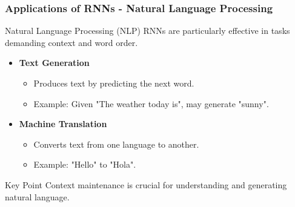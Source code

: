 \documentclass[aspectratio=169]{beamer}
\begin{document}
\begin{frame}[fragile]
    \frametitle{Applications of RNNs - Natural Language Processing}
    \begin{block}{Natural Language Processing (NLP)}
        RNNs are particularly effective in tasks demanding context and word order.
    \end{block}
    
    \begin{itemize}
        \item \textbf{Text Generation}
            \begin{itemize}
                \item Produces text by predicting the next word.
                \item Example: Given "The weather today is", may generate "sunny".
            \end{itemize}
        
        \item \textbf{Machine Translation}
            \begin{itemize}
                \item Converts text from one language to another.
                \item Example: "Hello" to "Hola".
            \end{itemize}
    \end{itemize}

    \begin{block}{Key Point}
        Context maintenance is crucial for understanding and generating natural language.
    \end{block}
\end{frame}
\end{document}
